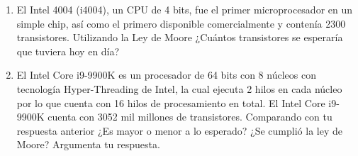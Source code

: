 \documentclass[12pt,letterpaper]{article}
\begin{document}
\begin{enumerate}
  \bigskip
  
\item El Intel 4004 (i4004), un CPU de 4 bits, fue el primer microprocesador en un simple chip, así como el primero disponible comercialmente y contenía 2300 transistores. Utilizando la Ley de Moore ¿Cuántos transistores se esperaría que tuviera hoy en día?
  \bigskip
  
  \bigskip
  
\item El Intel Core i9-9900K es un procesador de 64 bits con 8 núcleos con tecnología Hyper-Threading de Intel, la cual ejecuta 2 hilos en cada núcleo por lo que cuenta con 16 hilos de procesamiento en total. El Intel Core i9-9900K cuenta con 3052 mil millones de transistores. Comparando con tu respuesta anterior ¿Es mayor o menor a lo esperado? ¿Se cumplió la ley de Moore? Argumenta tu respuesta.

  \bigskip
  
  \bigskip
\end{enumerate}
\end{document}
